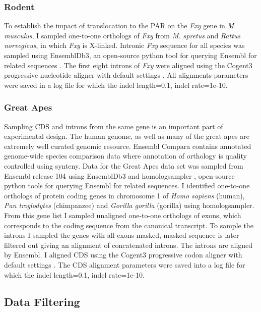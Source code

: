 \subsubsection{Rodent}

To establish the impact of translocation to the PAR on the \textit{Fxy} gene in \textit{M. musculus}, I sampled one-to-one orthologs of \textit{Fxy} from \textit{M. spretus} and \textit{Rattus norvegicus}, in which \textit{Fxy} is X-linked. Intronic \textit{Fxy} sequence for all species was sampled using EnsemblDb3, an open-source python tool for querying Ensembl for related sequences \citep{HuttleyEnsembldb3}. The first eight introns of \textit{Fxy} were  aligned using the Cogent3 progressive nucleotide aligner with default settings \citep{Knight2007PyCogent:Sequence}. All alignments parameters were saved in a log file for which the indel length=0.1, indel rate=1e-10. 

\subsubsection{Great Apes}

Sampling CDS and introns from the same gene is an important part of experimental design. The human genome, as well as many of the great apes are extremely well curated genomic resource. Ensembl Compara \cite{Herrero2016EnsemblResources} contains annotated genome-wide species comparison data where annotation of orthology is quality controlled using synteny. Data for the Great Apes data set was sampled from Ensembl release 104 \citep{Howe2021Ensembl2021} using EnsemblDb3 \citep{HuttleyEnsembldb3} and homologsampler \citep{HuttleyHomologsampler}, open-source python tools for querying Ensembl for related sequences. I identified one-to-one orthologs of protein coding genes in chromosome 1 of \textit{Homo sapiens} (human), \textit{Pan troglodytes} (chimpanzee) and \textit{Gorilla gorilla} (gorilla) using homologsampler. From this gene list I sampled unaligned one-to-one orthologs of exons, which corresponds to the coding sequence from the canonical transcript. To sample the introns I sampled the genes with all exons masked, masked sequence is later filtered out giving an alignment of concatenated introns. The introns are aligned by Ensembl. I aligned CDS using the Cogent3 progressive codon aligner with default settings \citep{Knight2007PyCogent:Sequence}. The CDS alignment parameters were saved into a log file for which the indel length=0.1, indel rate=1e-10. 

\subsection{Data Filtering}

